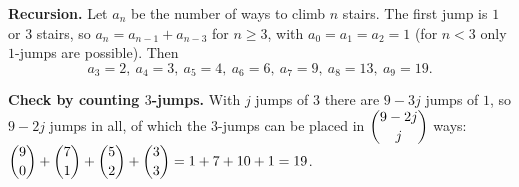 \textbf{Recursion.} Let $a_n$ be the number of ways to climb $n$ stairs. The first jump is $1$ or $3$ stairs, so $a_n=a_{n-1}+a_{n-3}$ for $n\ge3$, with $a_0=a_1=a_2=1$ (for $n<3$ only $1$-jumps are possible). Then
\[
a_3=2,\ a_4=3,\ a_5=4,\ a_6=6,\ a_7=9,\ a_8=13,\ a_9=\boxed{19}.
\]

\textbf{Check by counting $3$-jumps.} With $j$ jumps of $3$ there are $9-3j$ jumps of $1$, so $9-2j$ jumps in all, of which the $3$-jumps can be placed in $\dbinom{9-2j}{j}$ ways: $\dbinom90+\dbinom71+\dbinom52+\dbinom33=1+7+10+1=19$.
